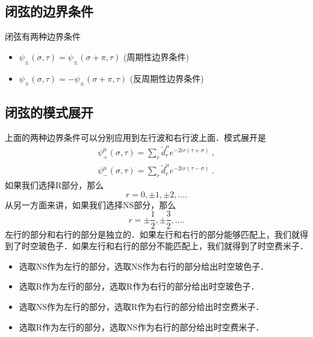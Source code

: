 \subsection{闭弦的边界条件}
闭弦有两种边界条件
\begin{itemize}
\item $\psi_{\pm}(\sigma,\tau) = \psi_{\pm}(\sigma+\pi,\tau)$ (周期性边界条件) 
\item $\psi_{\pm}(\sigma,\tau) = -\psi_{\pm}(\sigma+\pi,\tau)$ (反周期性边界条件)
\end{itemize}

\subsection{闭弦的模式展开}
上面的两种边界条件可以分别应用到左行波和右行波上面．模式展开是
\begin{equation}
\begin{aligned}
\psi^\mu_+(\sigma,\tau) = \sum_r \tilde d^\mu_r e^{- 2 i r (\tau+\sigma)}~, \\
\psi^\mu_-(\sigma,\tau) = \sum_r \tilde d^\mu_r e^{- 2 i r (\tau-\sigma)}~.
\end{aligned}
\end{equation}
如果我们选择R部分，那么
\begin{equation}
r = 0, \pm 1, \pm 2, \ldots .
\end{equation}
从另一方面来讲，如果我们选择NS部分，那么
\begin{equation}
r = \pm \frac{1}{2}, \pm \frac{3}{2}, \ldots.
\end{equation}
左行的部分和右行的部分是独立的．如果左行和右行的部分能够匹配上，我们就得到了时空玻色子．如果左行和右行的部分不能匹配上，我们就得到了时空费米子．
\begin{itemize}
\item 选取NS作为左行的部分，选取NS作为右行的部分给出时空玻色子． 
\item 选取R作为左行的部分，选取R作为右行的部分给出时空玻色子．
\item 选取NS作为左行的部分，选取R作为右行的部分给出时空费米子．
\item 选取R作为左行的部分，选取NS作为右行的部分给出时空费米子．
\end{itemize}


